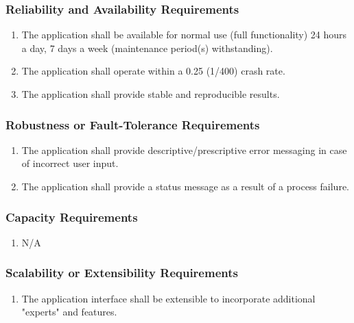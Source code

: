 \documentclass[]{article}
\begin{document}
\subsubsection{Reliability and Availability Requirements}
\label{ssub:reliability_and_availability_requirements}
\begin{enumerate}[{PR}1. ]
	\item The application shall be available for normal use (full functionality) 24 hours a day, 7 days a week (maintenance period(s) withstanding).
	\item The application shall operate within a 0.25 (1/400) crash rate.

	\item The application shall provide stable and reproducible results.
\end{enumerate}

\subsubsection{Robustness or Fault-Tolerance Requirements}
\label{ssub:robustness_or_fault_tolerance_requirements}
\begin{enumerate}[{PR}1. ]
	\item The application shall provide descriptive/prescriptive error messaging in case of incorrect user input.
	\item The application shall provide a status message as a result of a process failure.

\end{enumerate}

\subsubsection{Capacity Requirements}
\label{ssub:capacity_requirements}
\begin{enumerate}[{PR}1. ]
	\item N/A
\end{enumerate}

\subsubsection{Scalability or Extensibility Requirements}
\label{ssub:scalability_or_extensibility_requirements}
\begin{enumerate}[{PR}1. ]
	\item The application interface shall be extensible to incorporate additional "experts" and features.
\end{enumerate}
\end{document}

